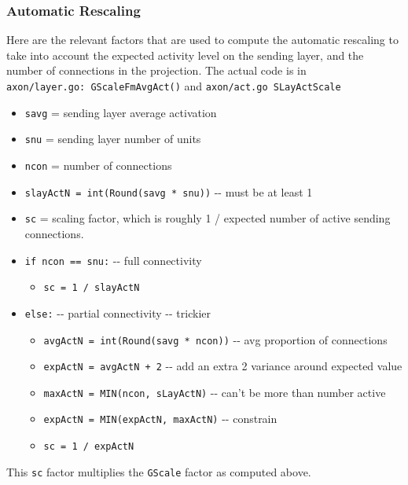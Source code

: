 \documentclass[11pt,twoside]{article}
\newif\myifpdf
\begin{document}
\hypertarget{automatic-rescaling}{%
\subsubsection{Automatic Rescaling}\label{automatic-rescaling}}

Here are the relevant factors that are used to compute the automatic
rescaling to take into account the expected activity level on the
sending layer, and the number of connections in the projection. The
actual code is in \texttt{axon/layer.go:\ GScaleFmAvgAct()} and
\texttt{axon/act.go\ SLayActScale}

\begin{itemize}
\tightlist
\item
  \texttt{savg} = sending layer average activation
\item
  \texttt{snu} = sending layer number of units
\item
  \texttt{ncon} = number of connections
\item
  \texttt{slayActN\ =\ int(Round(savg\ *\ snu))} -\/- must be at least 1
\item
  \texttt{sc} = scaling factor, which is roughly 1 / expected number of
  active sending connections.
\item
  \texttt{if\ ncon\ ==\ snu:} -\/- full connectivity

  \begin{itemize}
  \tightlist
  \item
    \texttt{sc\ =\ 1\ /\ slayActN}
  \end{itemize}
\item
  \texttt{else:} -\/- partial connectivity -\/- trickier

  \begin{itemize}
  \tightlist
  \item
    \texttt{avgActN\ =\ int(Round(savg\ *\ ncon))} -\/- avg proportion
    of connections
  \item
    \texttt{expActN\ =\ avgActN\ +\ 2} -\/- add an extra 2 variance
    around expected value
  \item
    \texttt{maxActN\ =\ MIN(ncon,\ sLayActN)} -\/- can't be more than
    number active
  \item
    \texttt{expActN\ =\ MIN(expActN,\ maxActN)} -\/- constrain
  \item
    \texttt{sc\ =\ 1\ /\ expActN}
  \end{itemize}
\end{itemize}

This \texttt{sc} factor multiplies the \texttt{GScale} factor as
computed above.
\end{document}
